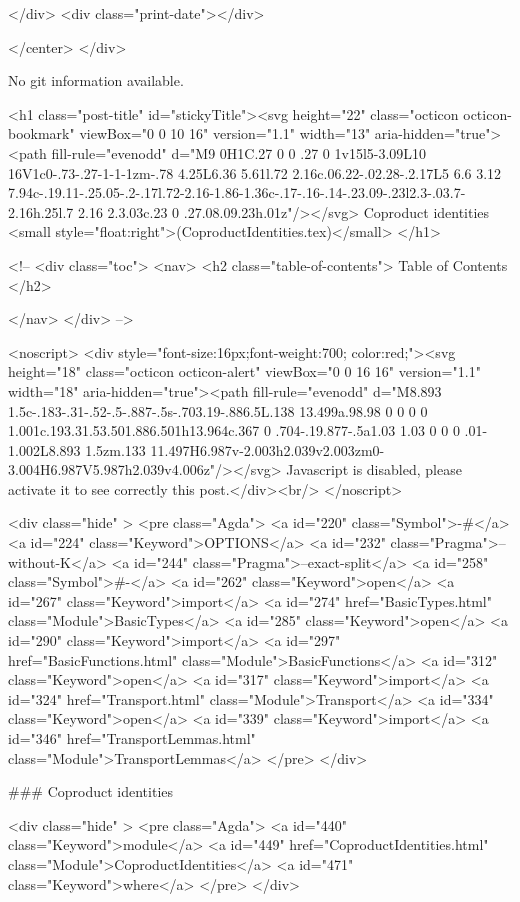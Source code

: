           
        </div>
        <div class="print-date"></div>
        
        
    </center>
  </div>

  
  No git information available.
  

  <h1 class="post-title" id="stickyTitle"><svg height="22" class="octicon octicon-bookmark" viewBox="0 0 10 16" version="1.1" width="13" aria-hidden="true"><path fill-rule="evenodd" d="M9 0H1C.27 0 0 .27 0 1v15l5-3.09L10 16V1c0-.73-.27-1-1-1zm-.78 4.25L6.36 5.61l.72 2.16c.06.22-.02.28-.2.17L5 6.6 3.12 7.94c-.19.11-.25.05-.2-.17l.72-2.16-1.86-1.36c-.17-.16-.14-.23.09-.23l2.3-.03.7-2.16h.25l.7 2.16 2.3.03c.23 0 .27.08.09.23h.01z"/></svg> Coproduct identities <small style="float:right">(CoproductIdentities.tex)</small>
  </h1>

  <!-- 
  <div class="toc">
    <nav>
    <h2 class="table-of-contents"> Table of Contents </h2>
      

    </nav>
  </div>
   -->

  <noscript>
  <div style="font-size:16px;font-weight:700; color:red;"><svg height="18" class="octicon octicon-alert" viewBox="0 0 16 16" version="1.1" width="18" aria-hidden="true"><path fill-rule="evenodd" d="M8.893 1.5c-.183-.31-.52-.5-.887-.5s-.703.19-.886.5L.138 13.499a.98.98 0 0 0 0 1.001c.193.31.53.501.886.501h13.964c.367 0 .704-.19.877-.5a1.03 1.03 0 0 0 .01-1.002L8.893 1.5zm.133 11.497H6.987v-2.003h2.039v2.003zm0-3.004H6.987V5.987h2.039v4.006z"/></svg> Javascript is disabled, please activate it to see correctly this post.</div><br/>
  </noscript>

  <div class="hide" >
<pre class="Agda">
<a id="220" class="Symbol">{-#</a> <a id="224" class="Keyword">OPTIONS</a> <a id="232" class="Pragma">--without-K</a> <a id="244" class="Pragma">--exact-split</a> <a id="258" class="Symbol">#-}</a>
<a id="262" class="Keyword">open</a> <a id="267" class="Keyword">import</a> <a id="274" href="BasicTypes.html" class="Module">BasicTypes</a>
<a id="285" class="Keyword">open</a> <a id="290" class="Keyword">import</a> <a id="297" href="BasicFunctions.html" class="Module">BasicFunctions</a>
<a id="312" class="Keyword">open</a> <a id="317" class="Keyword">import</a> <a id="324" href="Transport.html" class="Module">Transport</a>
<a id="334" class="Keyword">open</a> <a id="339" class="Keyword">import</a> <a id="346" href="TransportLemmas.html" class="Module">TransportLemmas</a>
</pre>
</div>

### Coproduct identities

<div class="hide" >
<pre class="Agda">
<a id="440" class="Keyword">module</a>
  <a id="449" href="CoproductIdentities.html" class="Module">CoproductIdentities</a>
  <a id="471" class="Keyword">where</a>
</pre>
</div>

